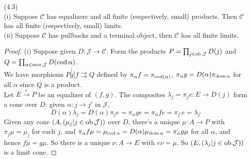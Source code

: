 \documentclass[a4paper]{article}
\begin{document}
\begin{thm} (4.3)\\
    (i) Suppose $\mathcal{C}$ has equalizers and all finite (respectively, small) products. Then $\mathcal{C}$ has all finite (respectively, small) limits.\\
    (ii) Suppose $\mathcal{C}$ has pullbacks and a terminal object, then $\mathcal{C}$ has all finite limits.
    \begin{proof}
        (i) Suppose given $D:\mathcal{J} \to \mathcal{C}$. Form the products $P=\prod_{j \in \operatorname{ob}\mathcal{J}} D(j)$ and $Q = \prod_{\alpha \in \operatorname{mor}\mathcal{J}} D(\operatorname{cod} \alpha)$.\\
        We have morphisms $P \stackrel[g]{f}{\rightrightarrows} Q$ defined by $\pi_\alpha f = \pi_{\operatorname{cod}(\alpha)}$, $\pi_\alpha g = D(\alpha) \pi_{\operatorname{dom} \alpha}$ for all $\alpha$ since $Q$ is a product.\\
        Let $E \xrightarrow{e} P$ be an equalizer of $(f,g)$. The composites $\lambda_j = \pi_j e: E \to D(j)$ form a cone over $D$: given $\alpha: j \to j'$ in $\mathcal{J}$, 
        $$D(\alpha) \lambda_j = D(\alpha) \pi_j e = \pi_\alpha ge = \pi_\alpha fe = \pi_{j'} e = \lambda_{j'}$$
        Given any cone $(A,(\mu_j | j \in \operatorname{ob}\mathcal{J}))$ over $D$, there's a unique $\mu:A \to P$ with $\pi_j \mu = \mu_j$ for each $j$, and $\pi_\alpha f \mu = \mu_{\operatorname{cod} \alpha} = D(\alpha) \mu_{\operatorname{dom} \alpha} = \pi_\alpha g\mu$ for all $\alpha$, and hence $f\mu = g\mu$. So there is a unique $\nu:A \to E$ with $e\nu = \mu$. So $(E,(\lambda_j | j \in \operatorname{ob} \mathcal{J}))$ is a limit cone.


\end{proof}
\end{thm}
\end{document}
